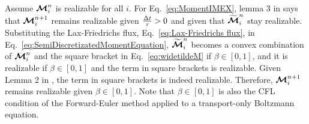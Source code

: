 Assume $\boldsymbol{\mathcal{M}}_{i}^{n}$ is realizable for all $i$. 
For Eq.~\eqref{eq:MomentIMEX}, lemma 3 in \cite{chu_etal_2018} says that $\boldsymbol{\mathcal{M}}^{n+1}_{i}$ remains realizable given $\frac{\Delta t}{\tau} > 0$ and given that $\widetilde{\boldsymbol{\mathcal{M}}}^{n}_{i}$ stay realizable.
Substituting the Lax-Friedrichs flux, Eq.~\eqref{eq:Lax-Friedrichs flux}, in Eq.~\eqref{eq:SemiDiscretizatedMomentEquation}, $\widetilde{\boldsymbol{\mathcal{M}}}^{n}_{i}$ becomes a convex combination of $\boldsymbol{\mathcal{M}}_{i}^{n}$ and the square bracket in Eq.~\eqref{eq:widetildeM} if $\beta \in [0,1]$, and it is realizable if $\beta \in [0,1]$ and the term in square brackets is realizable.
Given Lemma 2 in \cite{chu_etal_2018}, the term in square brackets is indeed realizable.
Therefore, $\boldsymbol{\mathcal{M}}^{n+1}_{i}$ remains realizable given $\beta \in [0,1]$.
Note that $\beta \in [0,1]$ is also the CFL condition of the Forward-Euler method applied to a transport-only Boltzmann equation.
